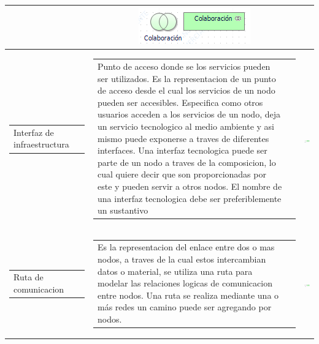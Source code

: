 \begin{longtable}{|c|c|c|}
\begin{tabular}{p{8cm}p{3cm}}
	\end{tabular}
	& \includegraphics[width=0.2\linewidth, height=0.05\textheight]{imgs/conceptos/tecnologica/colaboracion}
	\\			
	\hline
	\begin{tabular}{p{2cm}p{3cm}}
		Interfaz de infraestructura
	\end{tabular}
	&
	\begin{tabular}{p{8cm}p{3cm}} 
		Punto de acceso donde se los servicios pueden ser utilizados.
		Es la representacion de un punto de acceso desde el cual los servicios de un nodo pueden ser accesibles.
		Especifica como otros usuarios acceden a los servicios de un nodo, deja un servicio tecnologico al medio ambiente y asi mismo puede exponerse
		a traves de diferentes interfaces.
		Una interfaz tecnologica puede ser parte de un nodo a traves de la composicion, lo cual quiere decir que son proporcionadas por este y pueden servir 
		a otros nodos.
		El nombre de una interfaz tecnologica debe ser preferiblemente un sustantivo
		
	\end{tabular}
	& \includegraphics[width=0.2\linewidth, height=0.05\textheight]{imgs/conceptos/tecnologica/interfaceTecnologia}
	\\
	\hline
	
	\begin{tabular}{p{2cm}p{3cm}}
		Ruta de comunicacion 
	\end{tabular}
	&
	\begin{tabular}{p{8cm}p{3cm}} 
		Es la representacion del enlace entre dos o mas nodos, a traves de la cual estos intercambian datos o material, se utiliza una ruta para modelar
		las relaciones logicas de comunicacion entre nodos. Una ruta se realiza mediante una o más redes un camino puede ser agregando por nodos.
		
	\end{tabular} 
	& \includegraphics[width=0.2\linewidth, height=0.05\textheight]{imgs/conceptos/tecnologica/ruta}
	\\
	\hline
	

\end{longtable}
